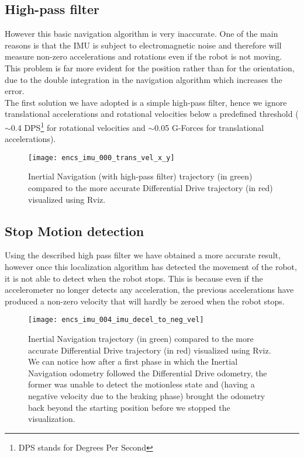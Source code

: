 \subsection{High-pass filter}

However this basic navigation algorithm is very inaccurate. One of the main reasons is that the IMU is subject to electromagnetic noise and therefore will measure non-zero accelerations and rotations even if the robot is not moving.\\
This problem is far more evident for the position rather than for the orientation, due to the double integration in the navigation algorithm which increases the error.\\

The first solution we have adopted is a simple high-pass filter, hence we ignore translational accelerations and rotational velocities below a predefined threshold ($\sim$0.4 DPS\footnote{DPS stands for Degrees Per Second} for rotational velocities and $\sim$0.05 G-Forces for translational accelerations).
\begin{figure}[!ht]
	\texttt{[image: encs\_imu\_000\_trans\_vel\_x\_y]}
	\captionsetup{justification=centering, margin=1.5cm}
	\centering
	\caption{Inertial Navigation (with high-pass filter) trajectory (in green) compared to the more accurate Differential Drive trajectory (in red) visualized using Rviz.}
	\centering
\end{figure}


\subsection{Stop Motion detection}

Using the described high pass filter we have obtained a more accurate result, however once this localization algorithm has detected the movement of the robot, it is not able to detect when the robot stops. This is because even if the accelerometer no longer detects any acceleration, the previous accelerations have produced a non-zero velocity that will hardly be zeroed when the robot stops.\\

\begin{figure}[!ht]
	\texttt{[image: encs\_imu\_004\_imu\_decel\_to\_neg\_vel]}
	\captionsetup{justification=centering, margin=1.5cm}
	\centering
	\caption{Inertial Navigation trajectory (in green) compared to the more accurate Differential Drive trajectory (in red) visualized using Rviz. We can notice how after a first phase in which the Inertial Navigation odometry followed the Differential Drive odometry, the former was unable to detect the motionless state and (having a negative velocity due to the braking phase) brought the odometry back beyond the starting position before we stopped the visualization.}
	\centering
\end{figure}

